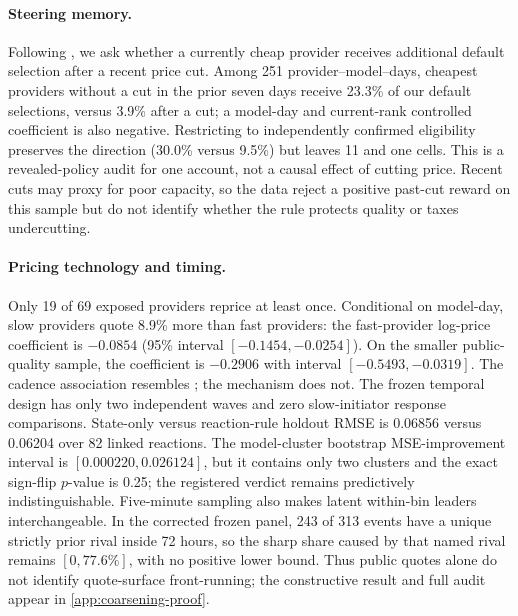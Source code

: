 \documentclass[11pt]{article}
\newcommand{\1}{\mathbf{1}}
\begin{document}
\paragraph{Steering memory.}
Following \citet{johnsonrhodeswildenbeest2023}, we ask whether a currently cheap
provider receives additional default selection after a recent price cut.  Among
251 provider--model--days, cheapest providers without a cut in the prior seven
days receive 23.3\% of our default selections, versus 3.9\% after a cut; a
model-day and current-rank controlled coefficient is also negative.  Restricting
to independently confirmed eligibility preserves the direction (30.0\% versus
9.5\%) but leaves 11 and one cells.  This is a revealed-policy audit for one
account, not a causal effect of cutting price.  Recent cuts may proxy for poor
capacity, so the data reject a positive past-cut reward on this sample but do not
identify whether the rule protects quality or taxes undercutting.

\paragraph{Pricing technology and timing.}
Only 19 of 69 exposed providers reprice at least once.  Conditional on model-day,
slow providers quote 8.9\% more than fast providers: the fast-provider log-price
coefficient is $-0.0854$ (95\% interval $[-0.1454,-0.0254]$).  On the smaller
public-quality sample, the coefficient is $-0.2906$ with interval
$[-0.5493,-0.0319]$.  The cadence association resembles
\citet{brownmackay2023}; the mechanism does not.  The frozen temporal design has
only two independent waves and zero slow-initiator response comparisons.
State-only versus reaction-rule holdout RMSE is 0.06856 versus 0.06204 over 82
linked reactions.  The model-cluster bootstrap MSE-improvement interval is
$[0.000220,0.026124]$, but it contains only two clusters and the exact sign-flip
$p$-value is 0.25; the registered verdict remains predictively indistinguishable.
Five-minute sampling also makes latent within-bin leaders interchangeable.  In
the corrected frozen panel, 243 of 313 events have a unique strictly prior rival
inside 72 hours, so the sharp share caused by that named rival remains
$[0,77.6\%]$, with no positive lower bound.  Thus public quotes alone do not
identify quote-surface front-running; the constructive result and full audit
appear in \cref{app:coarsening-proof}.
\end{document}
